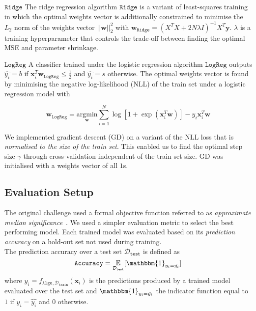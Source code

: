 \documentclass[10pt,conference,compsocconf]{IEEEtran}
\newcommand{\parabf}[1]{\vspace{1mm}\noindent\textbf{#1}}
\newcommand{\Dtrain}{\mathcal{D}_{\mathtt{train}}}
\newcommand{\Dtest}{\mathcal{D}_{\mathtt{test}}}
\newcommand{\features}{\mathbf{x}_i}
\newcommand{\target}{y_i}
\newcommand{\targetvector}{\mathbf{y}}
\newcommand{\weights}{\mathbf{w}}
\newcommand{\classifier}[2]{f_{#1, #2}}
\newcommand{\Train}{\mathtt{Algo}}
\newcommand{\Ridge}{\mathtt{Ridge}}
\newcommand{\LogReg}{\mathtt{LogReg}}
\begin{document}
\parabf{$\Ridge$} The ridge regression algorithm $\Ridge$ is a variant of least-squares training in which the optimal weights vector is additionally constrained to minimise the $L_2$ norm of the weights vector $||\weights||_2^2$ with $\weights_\Ridge = (X^T X + 2N\lambda I)^{-1}X^T \targetvector$. $\lambda$ is a training hyperparameter that controls the trade-off between finding the optimal MSE and parameter shrinkage.

\parabf{$\LogReg$} A classifier trained under the logistic regression algorithm $\LogReg$ outputs $\hat{\target} = b$ if $\features^T \weights_{\LogReg} \leq \frac{1}{2}$ and $\hat{\target} = s$ otherwise. The optimal weights vector is found by minimising the negative log-likelihood (NLL) of the train set under a logistic regression model with

\vspace*{-4mm}
\begin{equation}
	\weights_\LogReg = \underset{\weights}{\text{argmin}} \sum_{i=1}^{N} \log [ 1 + \exp(\features^T\weights) ] - \target\features^T\weights
\end{equation} 

We implemented gradient descent (GD) on a variant of the NLL loss that is \emph{normalised to the size of the train set}. This enabled us to find the optimal step size $\gamma$ through cross-validation independent of the train set size. GD was initialised with a weights vector of all $1$s.

\subsection{Evaluation Setup}
The original challenge used a formal objective function referred to as \emph{approximate median significance}~\cite{HiggsML}. We used a simpler evaluation metric to select the best performing model. Each trained model was evaluated based on its \emph{prediction accuracy} on a hold-out set not used during training.\\
The prediction accuracy over a test set $\Dtest$ is defined as
\begin{equation}
	\mathtt{Accuracy} = \underset{\Dtest}{\mathbb{E}}[ \mathbbm{1}_{\target = \hat{\target}} ]
\end{equation}
where $\hat{\target} = \classifier{\Train}{\Dtrain}(\features)$ is the predictions produced by a trained model evaluated over the test set and $\mathbbm{1}_{\target = \hat{\target}}$ the indicator function equal to $1$ if $\target = \hat{\target}$ and $0$ otherwise.
\end{document}
